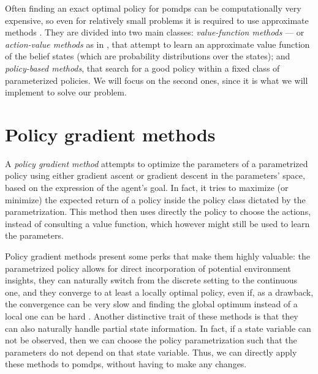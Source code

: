 Often finding an exact optimal policy for \acrshort{pomdp}s can be computationally very expensive, so even for relatively small problems it is required to use approximate methods \cite{Aberdeen2002ScalingIP}. They are divided into two main classes: \emph{value-function methods} --- or \emph{action-value methods} as in \cite{SuttonBarto}, that attempt to learn an approximate value function of the belief states (which are probability distributions over the states); and \emph{policy-based methods}, that search for a good policy within a fixed class of parameterized policies. We will focus on the second ones, since it is what we will implement to solve our problem.


\section{Policy gradient methods}

A \emph{policy gradient method} attempts to optimize the parameters of a parametrized policy using either gradient ascent or gradient descent in the parameters' space, based on the expression of the agent's goal. In fact, it tries to maximize (or minimize) the expected return of a policy inside the policy class dictated by the parametrization. This method then uses directly the policy to choose the actions, instead of consulting a value function, which however might still be used to learn the parameters.

Policy gradient methods present some perks that make them highly valuable: the parametrized policy allows for direct incorporation of potential environment insights, they can naturally switch from the discrete setting to the continuous one, and they converge to at least a locally optimal policy, even if, as a drawback, the convergence can be very slow and finding the global optimum instead of a local one can be hard \cite{Peters2010}. Another distinctive trait of these methods is that they can also naturally handle partial state information. In fact, if a state variable can not be observed, then we can choose the policy parametrization such that the parameters do not depend on that state variable. Thus, we can directly apply these methods to \acrshort{pomdp}s, without having to make any changes.

